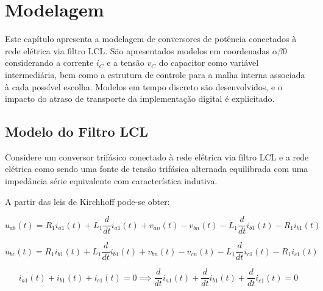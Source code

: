 
\chapter{Modelagem}\label{modelagem}

	Este capítulo apresenta a modelagem de conversores de potência conectados à rede
    elétrica via filtro LCL. São apresentados modelos em coordenadas $\alpha \beta 0$
    \cite{ref:JORGE} considerando a corrente $i_C$ e a tensão $v_C$ do capacitor como
    variável intermediária, bem como a estrutura de controle para a malha interna
    associada à cada possível escolha. Modelos em tempo discreto são desenvolvidos,
    e o impacto do atraso de transporte da implementação digital é explicitado.


\section{Modelo do Filtro LCL}

    Considere um conversor trifásico conectado à rede elétrica via filtro LCL
    e a rede elétrica como sendo uma fonte de tensão trifásica alternada
    equilibrada com uma impedância série equivalente com característica indutiva.

    A partir das leis de Kirchhoff pode-se obter:

    \begin{equation*}
        u_{ab}(t) = R_1 i_{a1}(t) + L_1 \frac{d}{dt} i_{a1}(t) + v_{an}(t)
            - v_{bn}(t) - L_1 \frac{d}{dt} i_{b1}(t) - R_1 i_{b1}(t)
    \end{equation*}

    \begin{equation*}
        u_{bc}(t) = R_1 i_{b1}(t) + L_1 \frac{d}{dt} i_{b1}(t) + v_{bn}(t)
            - v_{cn}(t) - L_1 \frac{d}{dt} i_{c1}(t) - R_1 i_{c1}(t)
    \end{equation*}

    \begin{equation*}
        i_{a1}(t) + i_{b1}(t) + i_{c1}(t) = 0 \implies \frac{d}{dt} i_{a1}(t)
            + \frac{d}{dt} i_{b1}(t) + \frac{d}{dt} i_{c1}(t) = 0
    \end{equation*}

